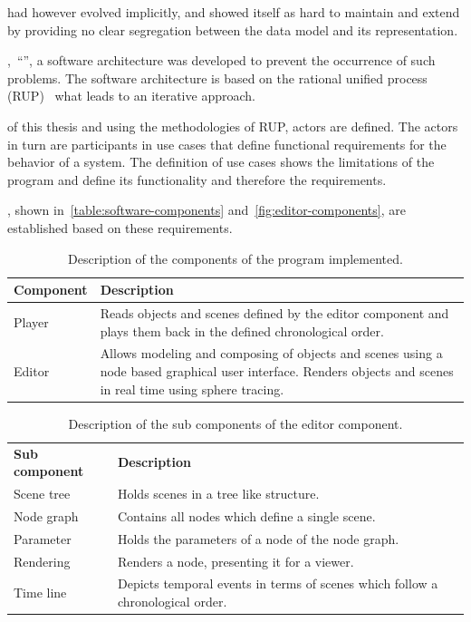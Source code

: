 \documentclass[%
    a4paper,    %
    justified,  %
    nobib,      %
    openany     %
]{tufte-book}
\begin{document}
 had however evolved implicitly,
and showed itself as hard to maintain and extend by providing no clear
segregation between the data model and its representation.

,~\enquote{}, a software architecture was
developed to prevent the occurrence of such problems. The software architecture
is based on the rational unified process (RUP)~\cite{kruchten_rup_2003} what
leads to an iterative approach.

 of this thesis and using the methodologies of
RUP, actors are defined. The actors in turn are participants in use cases that
define functional requirements for the behavior of a system. The definition of
use cases shows the limitations of the program and define its functionality and
therefore the requirements.

, shown in~\autoref{table:software-components}
and~\autoref{fig:editor-components}, are established based on these
requirements.

\begin{table}[h]
  \begin{tabularx}{\textwidth}{lX}
    \toprule
    \textbf{Component} & \textbf{Description} \\
    \midrule
    Player & Reads objects and scenes defined by the editor component and plays
    them back in the defined chronological order.\\
    Editor & Allows modeling and composing of objects and
    scenes using a node based graphical user interface. Renders objects
    and scenes in real time using sphere tracing. \\
    \bottomrule
  \end{tabularx}
  \caption{Description of the components of the program implemented.}
  \label{table:software-components}
\end{table}

\begin{table}[h]
  \begin{tabularx}{\textwidth}{lX}
    \toprule
    \textbf{Sub component} & \textbf{Description} \\
    Scene tree & Holds scenes in a tree like structure.            \\
    Node graph & Contains all nodes which define a single scene.   \\
    Parameter  & Holds the parameters of a node of the node graph. \\
    Rendering  & Renders a node, presenting it for a viewer.       \\
    Time line  & Depicts temporal events in terms of scenes which follow a
    chronological order.                                           \\
    \bottomrule
  \end{tabularx}
  \caption{Description of the sub components of the editor component.}
  \label{table:editor:sub-components}
\end{table}
\end{document}
